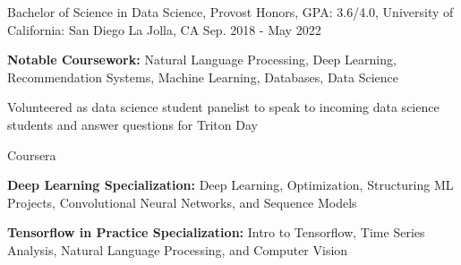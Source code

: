 
\begin{cventries}
  \cventry
    {Bachelor of Science in Data Science, Provost Honors, GPA: 3.6/4.0,} %
    {University of California: San Diego} %
    {La Jolla, CA} %
    {Sep. 2018 - May 2022} %
    {
      \begin{cvitems} %
         \item {\textbf{Notable Coursework:} {Natural Language Processing, Deep Learning, Recommendation Systems, Machine Learning, Databases, Data Science}}
         \item{Volunteered as data science student panelist to speak to incoming data science students and answer questions for Triton Day}
      \end{cvitems}
    }
    
  \cventry
    {} %
    {Coursera} %
    {} %
    {} %
    {
      \begin{cvitems} %
         \item {\textbf{Deep Learning Specialization:} {Deep Learning, Optimization, Structuring ML Projects, Convolutional Neural Networks, and Sequence Models}}
          \item {\textbf{Tensorflow in Practice Specialization:} {Intro to Tensorflow, Time Series Analysis, Natural Language Processing, and Computer Vision}}
      \end{cvitems}
    }
\end{cventries}

